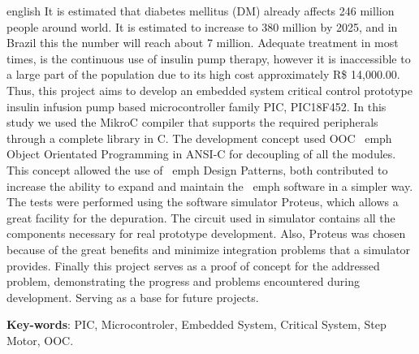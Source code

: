 \documentclass[	12pt, Times, openright, twoside, a4paper, english, brazil]{abntex2}
\begin{document}
\begin{resumo}[Abstract]
\begin{otherlanguage*}{english}
It is estimated that diabetes mellitus (DM) already affects 246 million people around world. It is estimated to increase to 380 million by 2025, and in Brazil this the number will reach about 7 million. Adequate treatment in most times, is the continuous use of insulin pump therapy, however it is inaccessible to a large part of the population due to its high cost approximately R\$ 14,000.00. Thus, this project aims to develop an embedded system critical control prototype insulin infusion pump based microcontroller family PIC, PIC18F452. In this study we used the MikroC compiler that supports the required peripherals through a complete library in C. The development concept used OOC \ emph {Object Orientated Programming in ANSI-C} for decoupling of all the modules. This concept allowed the use of \ emph {Design Patterns}, both contributed to increase the ability to expand and maintain the \ emph {software} in a simpler way. The tests were performed using the software simulator Proteus, which allows a great facility for the depuration. The circuit used in simulator  contains all the components necessary for real prototype development. 
Also, Proteus was chosen because of the great benefits and minimize integration problems that a simulator provides. Finally this project serves as a proof of concept for the addressed problem, demonstrating the progress and problems encountered during development. Serving as a base for future projects.

   \vspace{\onelineskip}
 
   \noindent 
   \textbf{Key-words}: PIC, Microcontroler, Embedded System, Critical System, Step Motor, OOC.
\end{otherlanguage*}
\end{resumo}

\listoffigures*
\cleardoublepage

\listoftables*
\cleardoublepage
\end{document}
